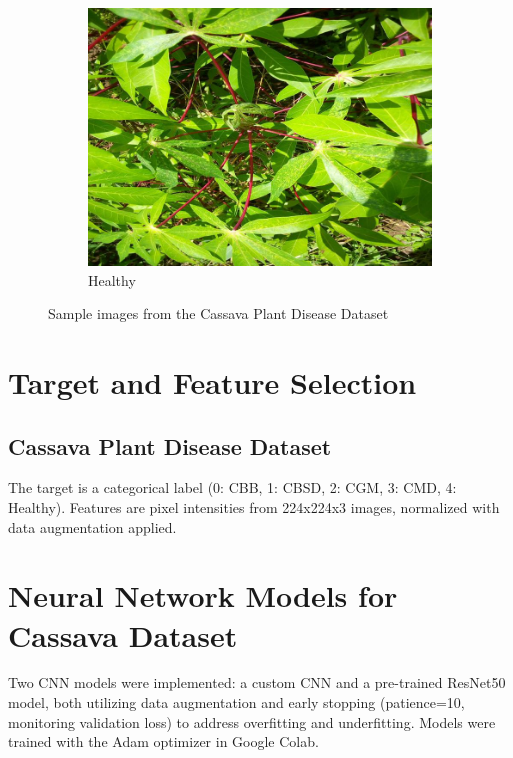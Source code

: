 \documentclass[a4paper,12pt]{article}
\begin{document}
\begin{figure}[H]
    \begin{subfigure}{0.45\textwidth}
        \centering
        \includegraphics[width=\textwidth]{assets/class_images/class_4.jpg}
        \caption{Healthy}
    \end{subfigure}
    \caption{Sample images from the Cassava Plant Disease Dataset}
\end{figure}

\clearpage %

\section*{Target and Feature Selection}
\subsection*{Cassava Plant Disease Dataset}
The target is a categorical label (0: CBB, 1: CBSD, 2: CGM, 3: CMD, 4: Healthy). Features are pixel intensities from 224x224x3 images, normalized with data augmentation applied.

\section*{Neural Network Models for Cassava Dataset}
Two CNN models were implemented: a custom CNN and a pre-trained ResNet50 model, both utilizing data augmentation and early stopping (patience=10, monitoring validation loss) to address overfitting and underfitting. Models were trained with the Adam optimizer in Google Colab.
\end{document}

